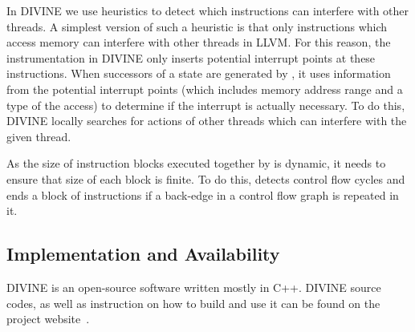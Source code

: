 In DIVINE we use heuristics to detect which instructions can interfere with
other threads.
A simplest version of such a heuristic is that only instructions which access
memory can interfere with other threads in LLVM.
For this reason, the instrumentation in DIVINE only inserts potential interrupt
points at these instructions.
When successors of a state are generated by \divm, it uses information from the
potential interrupt points (which includes memory address range and a type of
the access) to determine if the interrupt is actually necessary.
To do this, DIVINE locally searches for actions of other threads which can
interfere with the given thread.

As the size of instruction blocks executed together by \divm is dynamic, it
needs to ensure that size of each block is finite.
To do this, \divm detects control flow cycles and ends a block of instructions
if a back-edge in a control flow graph is repeated in it.

\subsection{Implementation and Availability}

DIVINE is an open-source software written mostly in C++.
DIVINE source codes, as well as instruction on how to build and use it can be found on the project website~.

